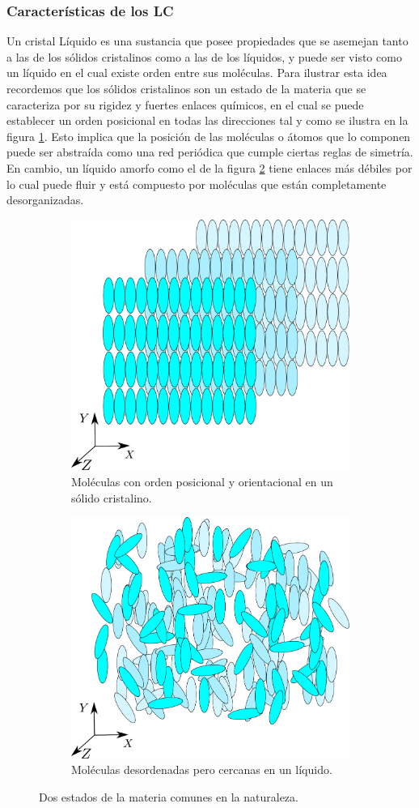 \subsubsection{Características de los LC}  
Un cristal Líquido es una sustancia que posee propiedades que
se asemejan tanto a las de los sólidos cristalinos como a las de los
líquidos, y puede ser visto como un líquido en el cual existe
orden entre sus moléculas. Para ilustrar esta idea recordemos que los
sólidos cristalinos son un estado de la materia que se caracteriza por
su rigidez y fuertes enlaces químicos, en el cual se puede
establecer un orden posicional en todas las direcciones tal y como se
ilustra en la figura \ref{fig:solido}. Esto implica que la posición de
las moléculas o átomos que lo componen puede ser abstraída como una
red periódica que cumple ciertas reglas de simetría. En cambio, un
líquido amorfo como el de la figura \ref{fig:liquido} tiene enlaces
más débiles por lo cual puede fluir y está compuesto
por moléculas que están completamente desorganizadas. 
\begin{figure}[h!]
\centering
\begin{subfigure}{.45\textwidth}
  \centering
  \includegraphics[width=.6\linewidth]{Cristaline_solid}
  \caption{Moléculas con orden posicional y orientacional en un sólido cristalino.}
  \label{fig:solido}
\end{subfigure}\qquad
\begin{subfigure}{.45\textwidth}
  \centering
  \includegraphics[width=.6\linewidth]{liquid}
  \caption{Moléculas desordenadas pero cercanas en un líquido.}
  \label{fig:liquido}
\end{subfigure}
\caption{Dos estados de la materia comunes en la naturaleza.}
  \label{fig:estados}
\end{figure}

